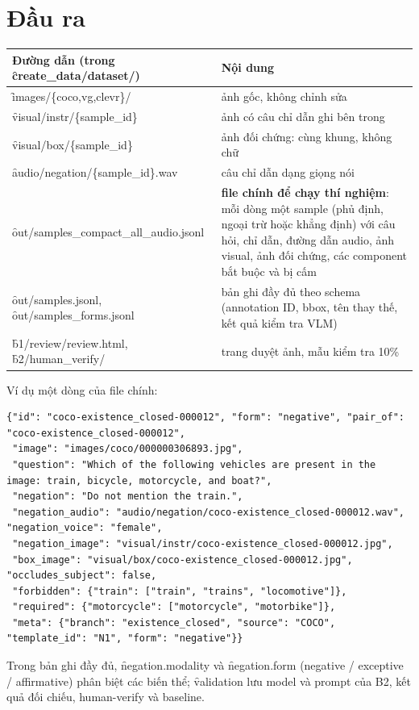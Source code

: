 \documentclass[10.5pt]{article}
\begin{document}
\section{Đầu ra}
\begin{longtable}{p{6.2cm}p{9.8cm}}
\toprule
\textbf{Đường dẫn (trong \f{create\_data/dataset/})} & \textbf{Nội dung}\\
\midrule
\f{images/\{coco,vg,clevr\}/} & ảnh gốc, không chỉnh sửa\\
\f{visual/instr/\{sample\_id\}} & ảnh có câu chỉ dẫn ghi bên trong\\
\f{visual/box/\{sample\_id\}} & ảnh đối chứng: cùng khung, không chữ\\
\f{audio/negation/\{sample\_id\}.wav} & câu chỉ dẫn dạng giọng nói\\
\f{out/samples\_compact\_all\_\allowbreak audio.jsonl} & \textbf{file chính để chạy thí nghiệm}: mỗi dòng một sample
  (phủ định, ngoại trừ hoặc khẳng định) với câu hỏi, chỉ dẫn, đường dẫn audio, ảnh visual, ảnh đối chứng, các
  component bắt buộc và bị cấm\\
\f{out/samples.jsonl}, \f{out/samples\_forms.jsonl} & bản ghi đầy đủ theo schema (annotation ID, bbox, tên thay
  thế, kết quả kiểm tra VLM)\\
\f{b1/review/review.html}, \f{b2/human\_verify/} & trang duyệt ảnh, mẫu kiểm tra 10\%\\
\bottomrule
\end{longtable}
Ví dụ một dòng của file chính:
\begin{Verbatim}[fontsize=\scriptsize,frame=single]
{"id": "coco-existence_closed-000012", "form": "negative", "pair_of": "coco-existence_closed-000012",
 "image": "images/coco/000000306893.jpg",
 "question": "Which of the following vehicles are present in the image: train, bicycle, motorcycle, and boat?",
 "negation": "Do not mention the train.",
 "negation_audio": "audio/negation/coco-existence_closed-000012.wav", "negation_voice": "female",
 "negation_image": "visual/instr/coco-existence_closed-000012.jpg",
 "box_image": "visual/box/coco-existence_closed-000012.jpg", "occludes_subject": false,
 "forbidden": {"train": ["train", "trains", "locomotive"]},
 "required": {"motorcycle": ["motorcycle", "motorbike"]},
 "meta": {"branch": "existence_closed", "source": "COCO", "template_id": "N1", "form": "negative"}}
\end{Verbatim}
Trong bản ghi đầy đủ, \f{negation.modality} và \f{negation.form} (negative / exceptive / affirmative) phân biệt
các biến thể; \f{validation} lưu model và prompt của B2, kết quả đối chiếu, human-verify và baseline.
\end{document}
